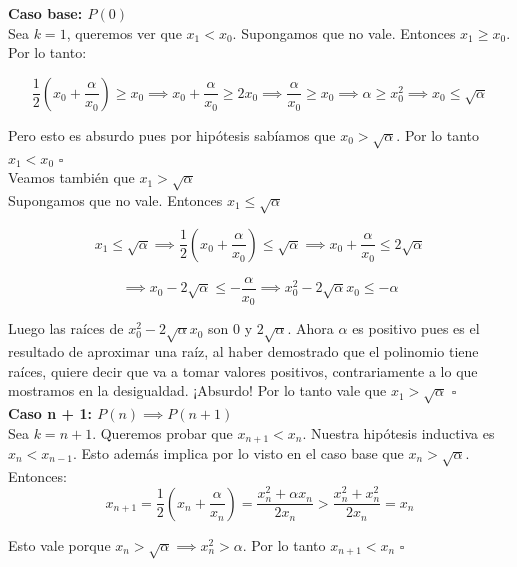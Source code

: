 {\bf Caso base: $P(0)$}\\
Sea $k = 1$, queremos ver que $x_1 < x_0$. Supongamos que no vale. Entonces $x_1 \ge x_0$. Por lo tanto:

\begin{displaymath}
    \frac{1}{2}(x_0 + \frac{\alpha}{x_0}) \ge x_0 \implies x_0 + \frac{\alpha}{x_0} \ge 2x_0 \implies \frac{\alpha}{x_0} \ge x_0 \implies \alpha \ge x_0^2 \implies x_0 \le \sqrt{\alpha}
\end{displaymath}

Pero esto es absurdo pues por hipótesis sabíamos que $x_0 > \sqrt{\alpha}$. Por lo tanto $x_1 < x_0$ $\square$\\

Veamos también que $x_1 > \sqrt{\alpha}$\\

Supongamos que no vale. Entonces $x_1 \le \sqrt{\alpha}$

\begin{displaymath}
    x_1 \le \sqrt{\alpha} \implies \frac{1}{2}(x_0 + \frac{\alpha}{x_0}) \le \sqrt{\alpha} \implies x_0 + \frac{\alpha}{x_0} \le 2\sqrt{\alpha}
\end{displaymath}

\begin{displaymath}
    \implies x_0 - 2\sqrt{\alpha} \le -\frac{\alpha}{x_0} \implies x_0^2 - 2\sqrt{\alpha}x_0 \le -\alpha
\end{displaymath}

Luego las raíces de $x_0^2 - 2\sqrt{\alpha}x_0$ son $0$ y $2\sqrt{\alpha}$. Ahora $\alpha$ es positivo pues es el resultado de aproximar una raíz, al haber demostrado que el polinomio tiene raíces, quiere decir que va a tomar valores positivos, contrariamente a lo que mostramos en la desigualdad. ¡Absurdo! Por lo tanto vale que $x_1 > \sqrt{\alpha}$ $\square$\\

{\bf Caso n + 1: $P(n) \implies P(n + 1)$}\\
Sea $k = n + 1$. Queremos probar que $x_{n + 1} < x_n$. Nuestra hipótesis inductiva es $x_n < x_{n - 1}$. Esto además implica por lo visto en el caso base que $x_n > \sqrt{\alpha}$.\\

Entonces:
\begin{displaymath}
    x_{n + 1} = \frac{1}{2}(x_n + \frac{\alpha}{x_n}) = \frac{x_n^2 + \alpha x_n}{2x_n} > \frac{x_n^2 + x_n^2}{2x_n} = x_n
\end{displaymath}

Esto vale porque $x_n > \sqrt{\alpha} \implies x_n^2 > \alpha$. Por lo tanto $x_{n + 1} < x_n$ $\square$


